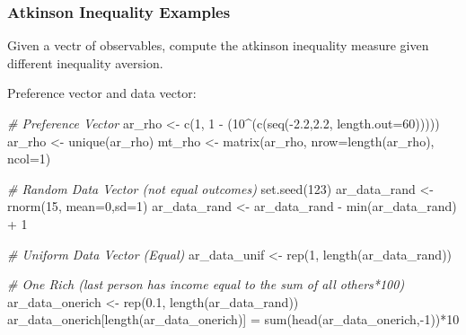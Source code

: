 \documentclass[
]{book}
\newenvironment{Shaded}{\begin{snugshade}}{\end{snugshade}}
\newcommand{\AttributeTok}[1]{\textcolor[rgb]{0.77,0.63,0.00}{#1}}
\newcommand{\CommentTok}[1]{\textcolor[rgb]{0.56,0.35,0.01}{\textit{#1}}}
\newcommand{\DecValTok}[1]{\textcolor[rgb]{0.00,0.00,0.81}{#1}}
\newcommand{\FloatTok}[1]{\textcolor[rgb]{0.00,0.00,0.81}{#1}}
\newcommand{\FunctionTok}[1]{\textcolor[rgb]{0.00,0.00,0.00}{#1}}
\newcommand{\NormalTok}[1]{#1}
\newcommand{\OtherTok}[1]{\textcolor[rgb]{0.56,0.35,0.01}{#1}}
\newcommand{\SpecialCharTok}[1]{\textcolor[rgb]{0.00,0.00,0.00}{#1}}
\begin{document}
\hypertarget{atkinson-inequality-examples}{%
\subsubsection{Atkinson Inequality Examples}\label{atkinson-inequality-examples}}

Given a vectr of observables, compute the atkinson inequality measure given different inequality aversion.

Preference vector and data vector:

\begin{Shaded}
\begin{Highlighting}[]
\CommentTok{\# Preference Vector }
\NormalTok{ar\_rho }\OtherTok{\textless{}{-}} \FunctionTok{c}\NormalTok{(}\DecValTok{1}\NormalTok{, }\DecValTok{1} \SpecialCharTok{{-}}\NormalTok{ (}\DecValTok{10}\SpecialCharTok{\^{}}\NormalTok{(}\FunctionTok{c}\NormalTok{(}\FunctionTok{seq}\NormalTok{(}\SpecialCharTok{{-}}\FloatTok{2.2}\NormalTok{,}\FloatTok{2.2}\NormalTok{, }\AttributeTok{length.out=}\DecValTok{60}\NormalTok{)))))}
\NormalTok{ar\_rho }\OtherTok{\textless{}{-}} \FunctionTok{unique}\NormalTok{(ar\_rho)}
\NormalTok{mt\_rho }\OtherTok{\textless{}{-}} \FunctionTok{matrix}\NormalTok{(ar\_rho, }\AttributeTok{nrow=}\FunctionTok{length}\NormalTok{(ar\_rho), }\AttributeTok{ncol=}\DecValTok{1}\NormalTok{)}
  
\CommentTok{\# Random Data Vector (not equal outcomes)}
\FunctionTok{set.seed}\NormalTok{(}\DecValTok{123}\NormalTok{)}
\NormalTok{ar\_data\_rand }\OtherTok{\textless{}{-}} \FunctionTok{rnorm}\NormalTok{(}\DecValTok{15}\NormalTok{, }\AttributeTok{mean=}\DecValTok{0}\NormalTok{,}\AttributeTok{sd=}\DecValTok{1}\NormalTok{)}
\NormalTok{ar\_data\_rand }\OtherTok{\textless{}{-}}\NormalTok{ ar\_data\_rand }\SpecialCharTok{{-}} \FunctionTok{min}\NormalTok{(ar\_data\_rand) }\SpecialCharTok{+} \DecValTok{1}

\CommentTok{\# Uniform Data Vector (Equal)}
\NormalTok{ar\_data\_unif }\OtherTok{\textless{}{-}} \FunctionTok{rep}\NormalTok{(}\DecValTok{1}\NormalTok{, }\FunctionTok{length}\NormalTok{(ar\_data\_rand))}

\CommentTok{\# One Rich (last person has income equal to the sum of all others*100)}
\NormalTok{ar\_data\_onerich }\OtherTok{\textless{}{-}} \FunctionTok{rep}\NormalTok{(}\FloatTok{0.1}\NormalTok{, }\FunctionTok{length}\NormalTok{(ar\_data\_rand))}
\NormalTok{ar\_data\_onerich[}\FunctionTok{length}\NormalTok{(ar\_data\_onerich)] }\OtherTok{=} \FunctionTok{sum}\NormalTok{(}\FunctionTok{head}\NormalTok{(ar\_data\_onerich,}\SpecialCharTok{{-}}\DecValTok{1}\NormalTok{))}\SpecialCharTok{*}\DecValTok{10}
\end{Highlighting}
\end{Shaded}
\end{document}
